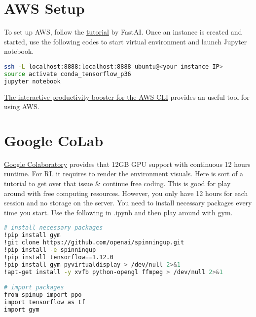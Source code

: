 
% 

\section{AWS Setup}

To set up AWS, follow the \href{https://course.fast.ai/start_aws.html}{tutorial} by FastAI. Once an instance is created and started, use the following codes to start virtual environment and launch Jupyter notebook. 

\begin{lstlisting}[language=bash,caption={Connect to AWS from Local Machine}]
ssh -L localhost:8888:localhost:8888 ubuntu@<your instance IP>
source activate conda_tensorflow_p36
jupyter notebook
\end{lstlisting}

\href{https://github.com/awslabs/aws-shell}{The interactive productivity booster for the AWS CLI} provides an useful tool for using AWS. 

\section{Google CoLab}

\href{https://colab.research.google.com}{Google Colaboratory} provides that 12GB GPU support with continuous 12 hours runtime. For RL it requires to render the environment visuals. \href{https://medium.com/@kaleajit27/reinforcement-learning-on-google-colab-9cb2e1ef51e}{Here} is sort of a tutorial to get over that issue \& continue free coding. This is good for play around with free computing resources. However, you only have 12 hours for each session and no storage on the server. You need to install necessary packages every time you start. Use the following in .ipynb and then play around with gym. 

\begin{lstlisting}[language=bash,caption={Google CoLab}] 
# install necessary packages
!pip install gym
!git clone https://github.com/openai/spinningup.git
!pip install -e spinningup  
!pip install tensorflow==1.12.0
!pip install gym pyvirtualdisplay > /dev/null 2>&1
!apt-get install -y xvfb python-opengl ffmpeg > /dev/null 2>&1

# import packages 
from spinup import ppo
import tensorflow as tf
import gym
\end{lstlisting}

